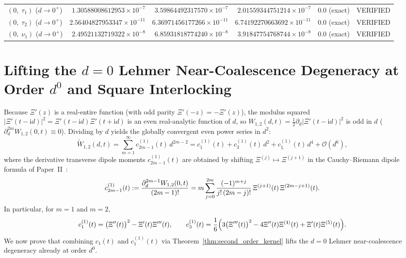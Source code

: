 \documentclass[11pt,reqno]{amsart}
\theoremstyle{definition}
\theoremstyle{remark}
\numberwithin{equation}{section}
\newcommand{\ii}{\mathrm{i}}
\newcommand{\fac}{\mathclose{\mathchar"0021}}
\begin{document}
\begin{table}[t]
\begin{tabular}{@{}lrrrrc@{}}
$(0,\; \tau_1)$ ($d\to 0^+$)   & $1.30588008612953\times 10^{-7}$  & $3.59864492317570\times 10^{-7}$  & $2.01559344751214\times 10^{-7}$  & $0.0$ (exact) & VERIFIED \\
$(0,\; \tau_2)$ ($d\to 0^+$)   & $2.56404827953347\times 10^{-11}$ & $6.36971456177266\times 10^{-11}$ & $6.74192270663692\times 10^{-11}$ & $0.0$ (exact) & VERIFIED \\
$(0,\; \nu_1)$ ($d\to 0^+$)    & $2.49521132719322\times 10^{-8}$  & $6.85931818774240\times 10^{-8}$  & $3.91847754768744\times 10^{-8}$  & $0.0$ (exact) & VERIFIED \\
\bottomrule
\end{tabular}
\end{table}

\section{Lifting the $d=0$ Lehmer Near-Coalescence Degeneracy at Order $d^0$ and Square Interlocking}\label{sec:lehmer_lifting}

Because $\Xi'(z)$ is a real-entire function (with odd parity $\Xi'(-z) = -\Xi'(z)$), the modulus squared $|\Xi'(t-\ii d)|^2 = \Xi'(t-\ii d)\Xi'(t+\ii d)$ is an even real-analytic function of $d$, so $W_{1,2}(d,t) = \frac{1}{2}\partial_d|\Xi'(t-\ii d)|^2$ is odd in $d$ ($\partial_d^{2m}W_{1,2}(0,t) \equiv 0$). Dividing by $d$ yields the globally convergent even power series in $d^2$:
\begin{equation}\label{eq:W12_power_series}
\widetilde{W}_{1,2}(d,t) = \sum_{m=1}^{\infty} c_{2m-1}^{(1)}(t)\,d^{2m-2} = c_1^{(1)}(t) + c_3^{(1)}(t)\,d^2 + c_5^{(1)}(t)\,d^4 + \mathcal{O}(d^6),
\end{equation}
where the derivative transverse dipole moments $c_{2m-1}^{(1)}(t)$ are obtained by shifting $\Xi^{(j)} \mapsto \Xi^{(j+1)}$ in the Cauchy--Riemann dipole formula of Paper~II~\cite{missiaen2026paper2}:
\begin{equation}\label{eq:c2m1_shift1_def}
c_{2m-1}^{(1)}(t) := \frac{\partial_d^{2m-1}W_{1,2}(0,t)}{(2m-1)\fac} = m\sum_{j=0}^{2m} \frac{(-1)^{m+j}}{j\fac\,(2m-j)\fac}\,\Xi^{(j+1)}(t)\,\Xi^{(2m-j+1)}(t).
\end{equation}
In particular, for $m = 1$ and $m = 2$,
\begin{equation}\label{eq:c1_1_c3_1_explicit}
c_1^{(1)}(t) = \bigl(\Xi''(t)\bigr)^2 - \Xi'(t)\Xi'''(t), \qquad c_3^{(1)}(t) = \frac{1}{6}\Bigl(3\bigl(\Xi'''(t)\bigr)^2 - 4\Xi''(t)\Xi^{(4)}(t) + \Xi'(t)\Xi^{(5)}(t)\Bigr).
\end{equation}
We now prove that combining $c_1(t)$ and $c_1^{(1)}(t)$ via Theorem~\ref{thm:second_order_kernel} lifts the $d = 0$ Lehmer near-coalescence degeneracy already at order $d^0$.
\end{document}
